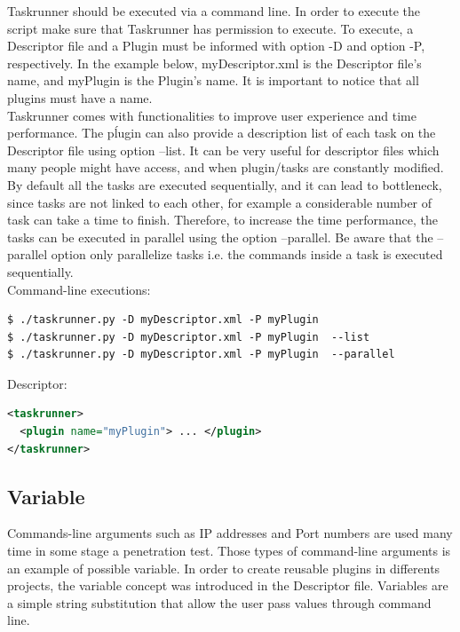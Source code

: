 \documentclass[a4paper, 12pt]{article}
\begin{document}
	Taskrunner should be executed via a command line. In order to execute the script make sure that Taskrunner has permission to execute. To execute,
a Descriptor file and a Plugin must be informed with option -D and option -P, respectively. In the example below, myDescriptor.xml is the Descriptor
file’s name, and myPlugin is the Plugin’s name. It is important to notice that all plugins must have a name. \\

	Taskrunner comes with functionalities to improve user experience and time performance. The pĺugin can also provide a description list of each task
on the Descriptor file using option --list. It can be very useful for descriptor files which many people might have access, and when plugin/tasks are
constantly modified. By default all the tasks are executed sequentially, and it can lead to bottleneck, since tasks are not linked to each other, for
example a considerable number of task can take a time to finish. Therefore, to increase the time performance, the tasks can be executed in parallel
using the option --parallel. Be aware that the --parallel option only parallelize tasks i.e. the commands inside a task is executed sequentially.\\

\noindent
Command-line executions:
\begin{lstlisting}
$ ./taskrunner.py -D myDescriptor.xml -P myPlugin
$ ./taskrunner.py -D myDescriptor.xml -P myPlugin  --list
$ ./taskrunner.py -D myDescriptor.xml -P myPlugin  --parallel
\end{lstlisting}

\noindent
Descriptor:
\begin{lstlisting}[language=xml]
<taskrunner>
  <plugin name="myPlugin"> ... </plugin>
</taskrunner>
\end{lstlisting}


\subsection{Variable}

	Commands-line arguments such as IP addresses and Port numbers are used many time in some stage a penetration test. Those types of command-line
arguments is an example of possible variable. In order to create reusable plugins in differents projects, the variable concept was introduced in the
Descriptor file. Variables are a simple string substitution that allow the user pass values through command line.\\
\end{document}
